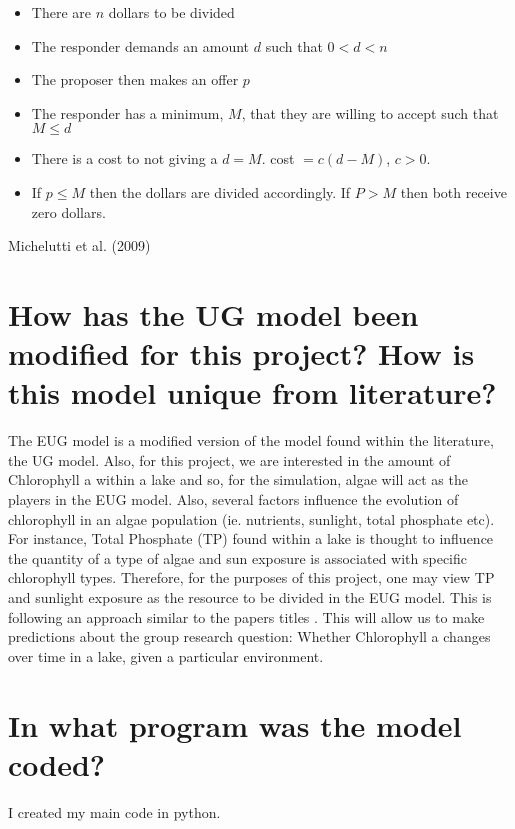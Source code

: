 \documentclass[]{article}
\begin{document}
\begin{itemize}
    \item There are $n$ dollars to be divided 
    \item The responder demands an amount $d$ such that $0<d<n$
    \item The proposer then makes an offer $p$
    \item The responder has a minimum, $M$, that they are willing to accept such that $M \leq d$
    \item There is a cost to not giving a $d = M$. cost $= c(d-M)$, $c>0$.
    \item If $p \leq M$ then the dollars are divided accordingly. If $P>M$ then both receive zero dollars.
\end{itemize}

Michelutti et al. (2009)

\section{How has the UG model been modified for this project? How is
this model unique from literature?}\label{how-has-the-ug-model-been-modified-for-this-project-how-is-this-model-unique-from-literature}
The EUG model is a modified version of the model found within the literature, the UG model. Also, for this project, we are interested in the amount of Chlorophyll a within a lake and so, for the simulation, algae will act as the players in the EUG model. Also, several factors influence the evolution of chlorophyll in an algae population (ie. nutrients, sunlight, total phosphate etc). For instance, Total Phosphate (TP) found within a lake is thought to influence the quantity of a type of algae and sun exposure is associated with specific chlorophyll types. Therefore, for the purposes of this project, one may view TP and sunlight exposure as the resource to be divided in the EUG model. This is following an approach similar to the papers titles     . This will allow us to make predictions about the group research question: Whether Chlorophyll a changes over time in a lake, given a particular environment. 

\section{In what program was the model
coded?}\label{in-what-program-was-the-model-coded}

I created my main code in python.
\end{document}
